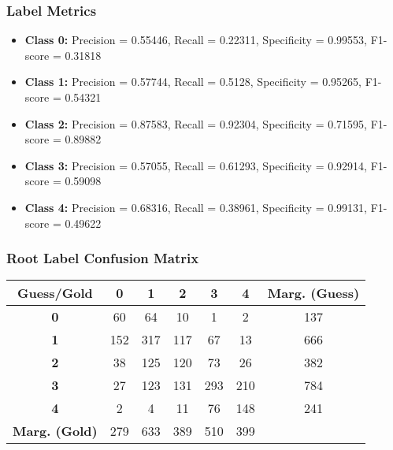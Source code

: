 \subsubsection{Label Metrics}
\begin{itemize}
	\item \textbf{Class 0:} Precision = 0.55446, Recall = 0.22311, Specificity = 0.99553, F1-score = 0.31818
	\item \textbf{Class 1:} Precision = 0.57744, Recall = 0.5128,  Specificity = 0.95265, F1-score = 0.54321
	\item \textbf{Class 2:} Precision = 0.87583, Recall = 0.92304, Specificity = 0.71595, F1-score = 0.89882
	\item \textbf{Class 3:} Precision = 0.57055, Recall = 0.61293, Specificity = 0.92914, F1-score = 0.59098
	\item \textbf{Class 4:} Precision = 0.68316, Recall = 0.38961, Specificity = 0.99131, F1-score = 0.49622
\end{itemize}

\subsubsection{Root Label Confusion Matrix}
\begin{table}[h]
	\centering
	\begin{tabular}{c|ccccc|c}
		\textbf{Guess/Gold}   & \textbf{0} & \textbf{1} & \textbf{2} & \textbf{3} & \textbf{4} & \textbf{Marg. (Guess)} \\
		\hline
		\textbf{0}            & 60         & 64         & 10         & 1          & 2          & 137                    \\
		\textbf{1}            & 152        & 317        & 117        & 67         & 13         & 666                    \\
		\textbf{2}            & 38         & 125        & 120        & 73         & 26         & 382                    \\
		\textbf{3}            & 27         & 123        & 131        & 293        & 210        & 784                    \\
		\textbf{4}            & 2          & 4          & 11         & 76         & 148        & 241                    \\
		\hline
		\textbf{Marg. (Gold)} & 279        & 633        & 389        & 510        & 399        &                        \\
	\end{tabular}
\end{table}

